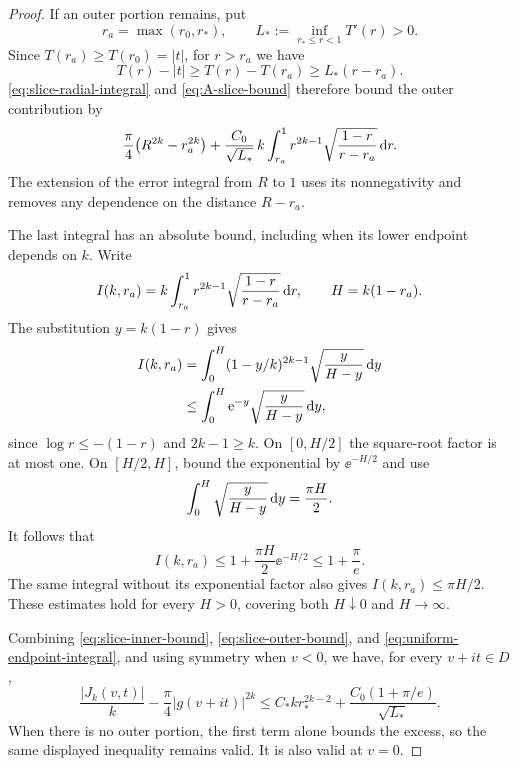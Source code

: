 \begin{proof}
If an outer portion remains, put
\[
 r_a=\max(r_0,r_*),\qquad
 L_*:=\inf_{r_*\le r<1}T'(r)>0.
\]
Since $T(r_a)\ge T(r_0)=|t|$, for $r>r_a$ we have
\begin{equation}\label{eq:gap-tail-bound}
 T(r)-|t|\ge T(r)-T(r_a)\ge L_*(r-r_a).
\end{equation}
\eqref{eq:slice-radial-integral} and \eqref{eq:A-slice-bound} therefore bound the outer contribution by
\begin{equation}\label{eq:slice-outer-bound}
 \frac{\pi}{4}\bigl(R^{2k}-r_a^{2k}\bigr)
  +\frac{C_0}{\sqrt{L_*}}\,
       k\int_{r_a}^{1}r^{2k-1}
                 \sqrt{\frac{1-r}{r-r_a}}\,\mathrm{d} r.
\end{equation}
The extension of the error integral from $R$ to $1$ uses its nonnegativity and removes any dependence on the distance $R-r_a$.

The last integral has an absolute bound, including when its lower endpoint depends on $k$.  Write
\[
 I(k,r_a)=k\int_{r_a}^{1}r^{2k-1}
                    \sqrt{\frac{1-r}{r-r_a}}\,\mathrm{d} r,
 \qquad H=k(1-r_a).
\]
The substitution $y=k(1-r)$ gives
\begin{align*}
 I(k,r_a)
   &=\int_0^H(1-y/k)^{2k-1}\sqrt{\frac{y}{H-y}}\,\mathrm{d} y\\
   &\le\int_0^H \mathrm{e}^{-y}\sqrt{\frac{y}{H-y}}\,\mathrm{d} y,
\end{align*}
since $\log r\le-(1-r)$ and $2k-1\ge k$. On $[0,H/2]$ the square-root factor is at most one.  On $[H/2,H]$, bound the exponential by $\ee^{-H/2}$ and use
\[
 \int_0^H\sqrt{\frac{y}{H-y}}\,\mathrm{d} y=\frac{\pi H}{2}.
\]
It follows that
\begin{equation}\label{eq:uniform-endpoint-integral}
 I(k,r_a)\le 1+\frac{\pi H}{2}\ee^{-H/2}
           \le 1+\frac{\pi}{e}.
\end{equation}
The same integral without its exponential factor also gives $I(k,r_a)\le\pi H/2$.  These estimates hold for every $H>0$, covering both $H\downarrow0$ and $H\to\infty$.

Combining \eqref{eq:slice-inner-bound}, \eqref{eq:slice-outer-bound}, and \eqref{eq:uniform-endpoint-integral}, and using symmetry when $v<0$, we have, for every $v+it\in D$,
\begin{equation}\label{eq:slice-uniform-error-bound}
 \frac{|J_k(v,t)|}{k}-\frac{\pi}{4}|g(v+it)|^{2k}
   \le C_*k r_*^{2k-2}
          +\frac{C_0(1+\pi/e)}{\sqrt{L_*}}.
\end{equation}
When there is no outer portion, the first term alone bounds the excess, so the same displayed inequality remains valid.  It is also valid at $v=0$.


\end{proof}
